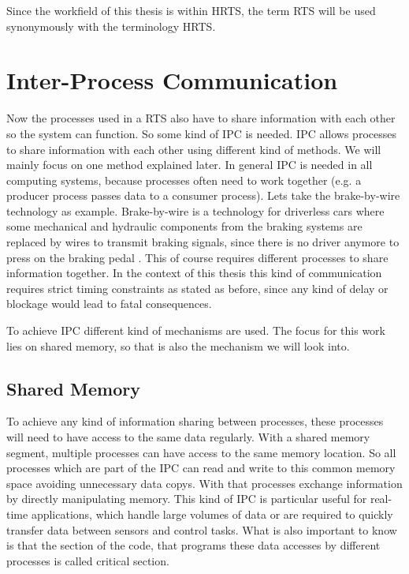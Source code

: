 Since the workfield of this thesis is within \ac{HRTS}, the term \ac{RTS} will be used synonymously with the terminology \ac{HRTS}.

\section{Inter-Process Communication}\label{sec:ipc}

Now the processes used in a \ac{RTS} also have to share information with each other so the system can function. So some kind of \ac{IPC} is needed. \ac{IPC} allows processes to share information with each other using different kind of methods. We will mainly focus on one method explained later. In general \ac{IPC} is needed in all computing systems, because processes often need to work together (e.g. a producer process passes data to a consumer process). Lets take the brake-by-wire technology as example. Brake-by-wire is a technology for driverless cars where some mechanical and hydraulic components from the braking systems are replaced by wires to transmit braking signals, since there is no driver anymore to press on the braking pedal \cite{BrakeByWire}. This of course requires different processes to share information together. In the context of this thesis this kind of communication requires strict timing constraints as stated as before, since any kind of delay or blockage would lead to fatal consequences. \cite{IPC,IPCMechanisms}

To achieve \ac{IPC} different kind of mechanisms are used. The focus for this work lies on shared memory, so that is also the mechanism we will look into. 

\subsection{Shared Memory}\label{subsec:shared-memory}

To achieve any kind of information sharing between processes, these processes will need to have access to the same data regularly. With a shared memory segment, multiple processes can have access to the same memory location. So all processes which are part of the \ac{IPC} can read and write to this common memory space avoiding unnecessary data copys. With that processes exchange information by directly manipulating memory. This kind of \ac{IPC} is particular useful for real-time applications, which handle large volumes of data or are required to quickly transfer data between sensors and control tasks. What is also important to know is that the section of the code, that programs these data accesses by different processes is called critical section. \cite{IPCMechanisms,SharedMemory,SharedMemoryMessagePassing,criticalSectionMutex}

